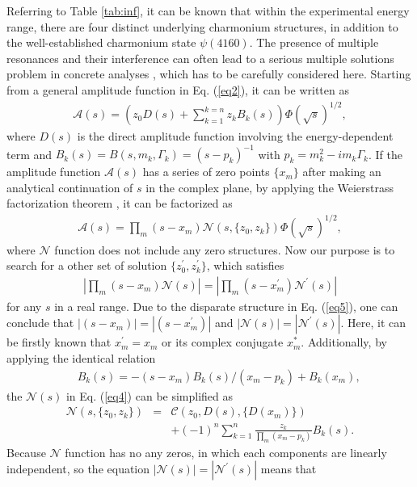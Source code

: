 \documentclass[prl,twocolumn,floatfix,amsmath,nofootinbib,amssymb,floatfix]{revtex4}
\begin{document}
Referring to Table \ref{tab:inf}, it can be known that within the experimental energy range, there are four distinct underlying charmonium structures, in addition to the well-established charmonium state $\psi(4160)$.  The presence of multiple resonances and their interference can often lead to a serious multiple solutions problem in concrete analyses \cite{Yuan:2009gd,Zhu:2011ha,Bai:2019jrb}, which has to be carefully considered here. Starting from a general amplitude function in Eq. (\ref{eq2}), it can be written as
\begin{eqnarray}
\mathcal{A}(s)=\left(z_0D(s)+\sum_{k=1}^{k=n}z_kB_k(s)\right)\Phi(\sqrt{s})^{1/2},
\end{eqnarray}
where $D(s)$ is the direct amplitude function involving the energy-dependent term and $B_k(s)=B(s,m_k,\Gamma_k)=(s-p_k)^{-1}$ with $p_k=m_k^2-im_k\Gamma_k$. If the amplitude function $\mathcal{A}(s)$ has a series of zero points $\{x_m\}$ after making an analytical continuation of $s$ in the complex plane, by applying the Weierstrass factorization theorem \cite{Knopp}, it can be factorized as
\begin{eqnarray}
\mathcal{A}(s)=\prod_m(s-x_m)\mathcal{N}\left(s,\{z_0,z_k\}\right)\Phi(\sqrt{s})^{1/2}, \label{eq4}
\end{eqnarray}
where $\mathcal{N}$ function does not include any zero structures. Now our purpose is to search for a other set of solution $\{z_0^{\prime},z_k^{\prime}\}$, which satisfies 
\begin{eqnarray}
   \left|\prod_m(s-x_m)\mathcal{N}(s)\right|=\left|\prod_m(s-x_m^{\prime})\mathcal{N}^{\prime}(s)\right| \label{eq5}
\end{eqnarray}
for any $s$ in a real range. Due to the disparate structure in Eq. (\ref{eq5}), one can conclude that  $ |(s-x_m)|=|(s-x_m^{\prime})|$ and $|\mathcal{N}(s)|=|\mathcal{N}^{\prime}(s)|$. Here, it can be firstly known that $x_m^{\prime}=x_m$ or its complex conjugate $x_m^{*}$.
Additionally, by applying the identical relation 
\begin{eqnarray}
   && B_k(s)=-(s-x_m)B_k(s)/(x_m-p_k)+B_k(x_m), 
\end{eqnarray}
the $\mathcal{N}(s)$ in Eq. (\ref{eq4}) can be simplified as
\begin{eqnarray}
\mathcal{N}(s,\{z_0,z_k\})&=&\mathcal{C}(z_0,D(s),\{D(x_m)\}) \nonumber \\
&&+(-1)^{n}\sum_{k=1}^{n}\frac{z_k}{\prod_m(x_m-p_k)}B_k(s).
\end{eqnarray}
Because $\mathcal{N}$ function has no any zeros, in which each components are linearly independent, so the equation $|\mathcal{N}(s)|=|\mathcal{N}^{\prime}(s)|$ means that
\end{document}
